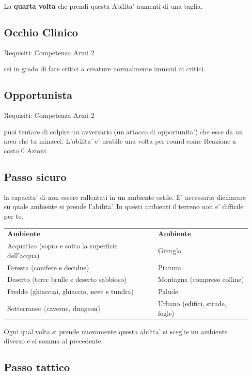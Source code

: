 \documentclass[a4paper,11pt,twoside,openany]{book}
\begin{document}
La \textbf{quarta volta} che prendi questa Abilita' aumenti di una taglia.

\subsection{Occhio Clinico}

Requisiti: Competenza Armi 2

sei in grado di fare critici a creature normalmente immuni ai critici.

\subsection{Opportunista}

Requisiti: Competenza Armi 2

puoi tentare di colpire un avversario (un attacco di opportunita') che esce da un area che tu minacci. L'abilita' e' usabile una volta per round come Reazione a costo 0 Azioni.

\subsection{Passo sicuro}

la capacita' di non essere rallentati in un ambiente ostile. E' necessario dichiarare su quale ambiente si prende l'abilita'. In questi ambienti il terreno non e' difficile per te.

\bigskip

\begin{tabular}{ll}
\toprule
\textbf{Ambiente} & \textbf{Ambiente}\tabularnewline
Acquatico (sopra e sotto la superficie dell'acqua) & Giungla\tabularnewline
Foresta (conifere e decidue) & Pianura\tabularnewline
Deserto (terre brulle e deserto sabbioso) & Montagna (compreso colline)\tabularnewline
Freddo (ghiacciai, ghiaccio, neve e tundra) & Palude\tabularnewline
Sotterraneo (caverne, dungeon) & Urbano (edifici, strade, fogle)\tabularnewline

\end{tabular}

\bigskip

Ogni qual volta si prende nuovamente questa abilita' si sceglie un
ambiente diverso e si somma al precedente.

\subsection{Passo tattico}
\end{document}
